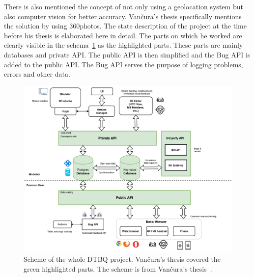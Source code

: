 \documentclass[thesis=B,english]{FITthesis}[2019/12/23]
\begin{document}
            There is also mentioned the concept of not only using a geolocation system but also computer vision for better accuracy. Vančura's thesis specifically mentions the solution by using 360\degree photos. The state description of the project at the time before his thesis is elaborated here in detail. The parts on which he worked are clearly visible in the schema~\ref{img:vancuraBigPicture} as the highlighted parts. These parts are mainly databases and private API. The public API is then simplified and the Bug API is added to  the public API. The Bug API serves the purpose of logging problems, errors and other data.
            \begin{figure}
                \centering
                \includegraphics[width = 1\linewidth]{VancuraBigPicture.png}
                \caption[Scheme of the whole DTBQ project]{Scheme of the whole DTBQ project. Vančura's thesis covered the green highlighted parts. The scheme is from Vančura's thesis~\cite{Vancura2020}.}
                \label{img:vancuraBigPicture}
            \end{figure}
            
\end{document}
